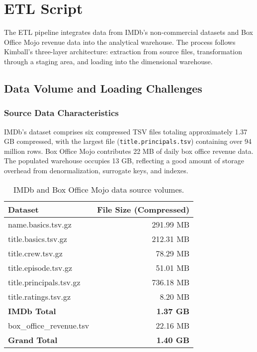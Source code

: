 \section{ETL Script}

The ETL pipeline integrates data from IMDb's non-commercial datasets and Box Office Mojo revenue data into the analytical warehouse. The process follows Kimball's three-layer architecture: extraction from source files, transformation through a staging area, and loading into the dimensional warehouse.

\subsection{Data Volume and Loading Challenges}

\subsubsection{Source Data Characteristics}

IMDb's dataset comprises six compressed TSV files totaling approximately 1.37 GB compressed, with the largest file (\texttt{title.principals.tsv}) containing over 94 million rows. Box Office Mojo contributes 22 MB of daily box office revenue data. The populated warehouse occupies 13 GB, reflecting a good amount of storage overhead from denormalization, surrogate keys, and indexes.

\begin{table}[h]
  \centering
  \caption{IMDb and Box Office Mojo data source volumes.}
  \label{tab:etl-volumes}
  \begin{tabular}{lr}
    \toprule
    \textbf{Dataset} & \textbf{File Size (Compressed)} \\
    \midrule
    name.basics.tsv.gz       & 291.99 MB \\
    title.basics.tsv.gz      & 212.31 MB \\
    title.crew.tsv.gz        & 78.29 MB \\
    title.episode.tsv.gz     & 51.01 MB \\
    title.principals.tsv.gz  & 736.18 MB \\
    title.ratings.tsv.gz     & 8.20 MB \\
    \midrule
    \textbf{IMDb Total}      & \textbf{1.37 GB} \\
    \midrule
    box\_office\_revenue.tsv & 22.16 MB \\
    \midrule
    \textbf{Grand Total}     & \textbf{1.40 GB} \\
    \bottomrule
  \end{tabular}
\end{table}

